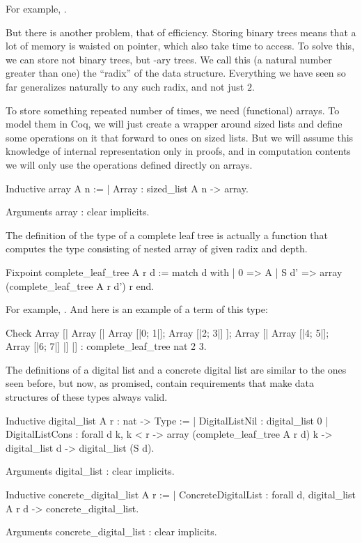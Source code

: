 \documentclass{article}
\begin{document}
For example, .

But there is another problem, that of efficiency. Storing binary trees means that a lot of memory is waisted on pointer, which also take time to access. To solve this, we can store not binary trees, but -ary trees. We call this  (a natural number greater than one) the ``radix'' of the data structure. Everything we have seen so far generalizes naturally to any such radix, and not just $2$.

To store something repeated number of times, we need (functional) arrays. To model them in Coq, we will just create a wrapper around sized lists and define some operations on it that forward to ones on sized lists. But we will assume this knowledge of internal representation only in proofs, and in computation contents we will only use the operations defined directly on arrays.

\begin{coq}
Inductive array {A n} :=
  | Array : sized_list A n -> array.

Arguments array : clear implicits.
\end{coq}

The definition of the type of a complete leaf tree is actually a function that computes the type consisting of nested array of given radix and depth.

\begin{coq}
Fixpoint complete_leaf_tree A r d :=
  match d with
  | 0 => A
  | S d' => array (complete_leaf_tree A r d') r
  end.
\end{coq}

For example, . And here is an example of a term of this type:

\begin{coq}
Check
    Array [|
        Array [|
            Array [|0; 1|];
            Array [|2; 3|]
        ];
        Array [|
            Array [|4; 5|];
            Array [|6; 7|]
        |]
    |]
    : complete_leaf_tree nat 2 3.
\end{coq}

The definitions of a digital list and a concrete digital list are similar to the ones seen before, but now, as promised, contain requirements that make data structures of these types always valid.

\begin{coq}
Inductive digital_list {A r} : nat -> Type :=
  | DigitalListNil : digital_list 0
  | DigitalListCons :
      forall {d} k,
      k < r ->
      array (complete_leaf_tree A r d) k ->
      digital_list d ->
      digital_list (S d).

Arguments digital_list : clear implicits.

Inductive concrete_digital_list {A r} :=
  | ConcreteDigitalList : forall d, digital_list A r d -> concrete_digital_list.

Arguments concrete_digital_list : clear implicits.
\end{coq}
\end{document}
